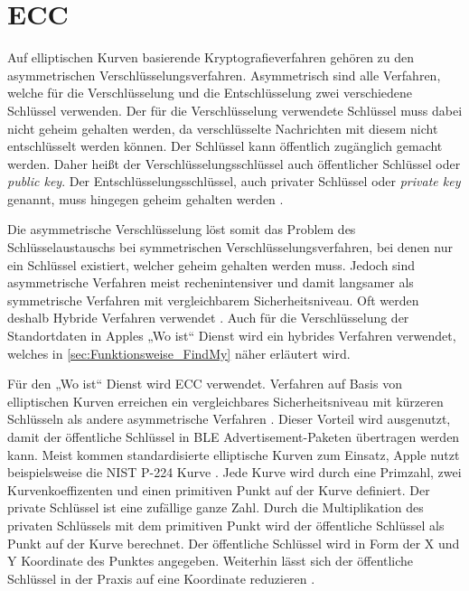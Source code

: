 \section{\ac{ECC}}
\label{sec:ecc}
Auf elliptischen Kurven basierende Kryptografieverfahren gehören zu den asymmetrischen Verschlüsselungsverfahren.
Asymmetrisch sind alle Verfahren, welche für die Verschlüsselung und die Entschlüsselung zwei verschiedene Schlüssel verwenden.
Der für die Verschlüsselung verwendete Schlüssel muss dabei nicht geheim gehalten werden, da verschlüsselte Nachrichten mit diesem nicht entschlüsselt werden können.
Der Schlüssel kann öffentlich zugänglich gemacht werden.
Daher heißt der Verschlüsselungsschlüssel auch öffentlicher Schlüssel oder \textit{public key}.
Der Entschlüsselungsschlüssel, auch privater Schlüssel oder \textit{private key} genannt, muss hingegen geheim gehalten werden \cite[S. 173ff.]{Krypto}.

Die asymmetrische Verschlüsselung löst somit das Problem des Schlüsselaustauschs bei symmetrischen Verschlüsselungsverfahren, bei denen nur ein Schlüssel existiert, welcher geheim gehalten werden muss.
Jedoch sind asymmetrische Verfahren meist rechenintensiver und damit langsamer als symmetrische Verfahren mit vergleichbarem Sicherheitsniveau.
Oft werden deshalb Hybride Verfahren verwendet \cite[S. 178f.]{Krypto}.
Auch für die Verschlüsselung der Standortdaten in Apples „Wo ist“ Dienst wird ein hybrides Verfahren verwendet, welches in \autoref{sec:Funktionsweise_FindMy} näher erläutert wird.

Für den „Wo ist“ Dienst wird \ac{ECC} verwendet.
Verfahren auf Basis von elliptischen Kurven erreichen ein vergleichbares Sicherheitsniveau mit kürzeren Schlüsseln als andere asymmetrische Verfahren \cite[S. 273.]{Krypto}.
Dieser Vorteil wird ausgenutzt, damit der öffentliche Schlüssel in \ac{BLE} Advertisement-Paketen übertragen werden kann.
Meist kommen standardisierte elliptische Kurven zum Einsatz, Apple nutzt beispielsweise die NIST P-224 Kurve \cite{Heinrich_FindMy}.
Jede Kurve wird durch eine Primzahl, zwei Kurvenkoeffizenten und einen primitiven Punkt auf der Kurve definiert.
Der private Schlüssel ist eine zufällige ganze Zahl.
Durch die Multiplikation des privaten Schlüssels mit dem primitiven Punkt wird der öffentliche Schlüssel als Punkt auf der Kurve berechnet.
Der öffentliche Schlüssel wird in Form der X und Y Koordinate des Punktes angegeben.
Weiterhin lässt sich der öffentliche Schlüssel in der Praxis auf eine Koordinate reduzieren \cite[S. 284f.]{Krypto}.

